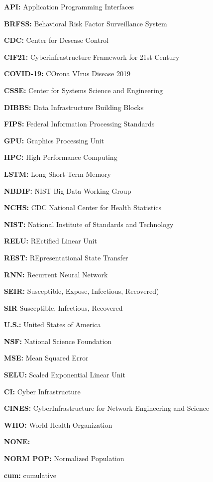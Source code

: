 \documentclass[12pt]{article}
\theoremstyle{definition}
\renewcommand{\_}{%
    \textunderscore\hspace{0pt}%
}
\begin{document}
\begin{itemize}[leftmargin=5cm]
\item[{\bf API:}] Application Programming Interfaces
\item[{\bf BRFSS:}] Behavioral Risk Factor Surveillance System
\item[{\bf CDC:}] Center for Desease Control
\item[{\bf CIF21:}] Cyberinfrastructure Framework for 21st Century 
\item[{\bf COVID-19:}] COrona VIrus Disease 2019 
\item[{\bf CSSE:}] Center for Systems Science and Engineering
\item[{\bf DIBBS:}] Data Infrastructure Building Blocks
\item[{\bf FIPS:}] Federal Information Processing Standards
\item[{\bf GPU:}] Graphics Processing Unit 
\item[{\bf HPC:}] High Performance Computing
\item[{\bf LSTM:}] Long Short-Term Memory
\item[{\bf NBDIF:}] NIST Big Data Working Group
\item[{\bf NCHS:}] CDC National Center for Health Statistics
\item[{\bf NIST:}] National Institute of Standards and Technology
\item[{\bf RELU:}] REctified Linear Unit
\item[{\bf REST:}] REpresentational State Transfer 
\item[{\bf RNN:}] Recurrent Neural Network
\item[{\bf SEIR:}] Susceptible, Expose, Infectious, Recovered)
\item[{\bf SIR}] Susceptible, Infectious, Recovered
\item[{\bf U.S.:}] United States of America
\item[{\bf NSF:}] National Science Foundation
\item[{\bf MSE:}] Mean Squared Error
\item[{\bf SELU:}] Scaled Exponential Linear Unit
\item[{\bf CI:}] Cyber Infrastructure
\item[{\bf CINES:}] CyberInfrastructure for Network Engineering and Science
\item[{\bf WHO:}] World Health Organization
\item[{\bf NONE:}] 
\item[{\bf NORM\_POP:}] Normalized Population
\item[{\bf cum:}] cumulative
\end{itemize}
\end{document}
